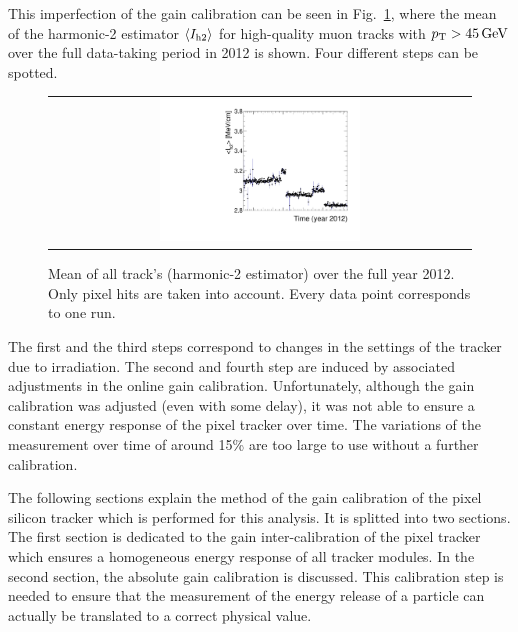 This imperfection of the gain calibration can be seen in Fig.~\ref{fig:StabilityPlot_beforeCalibration}, where the mean of the harmonic-2 estimator $\langle I_{\text{h2}} \rangle$ for high-quality muon tracks with $p_{\text{T}}>45\,\text{Ge}\kern-0.06667em\text{V}$ over the full data-taking period in 2012 is shown.
Four different steps can be spotted.
\begin{figure}[!t]
  \centering 
  \begin{tabular}{c}
  \includegraphics[width=0.49\textwidth]{figures/analysis/PixelCalibration/StabilityPlot_Pixel_beforeCalibration_withoutStepFits_NEW.pdf}
  \end{tabular}
  \caption{Mean of all track's \dedx (harmonic-2 estimator) over the full year 2012. Only pixel hits are taken into account. Every data point corresponds to one run.} 
  \label{fig:StabilityPlot_beforeCalibration}
\end{figure}
The first and the third steps correspond to changes in the settings of the tracker due to irradiation.
The second and fourth step are induced by associated adjustments in the online gain calibration.
Unfortunately, although the gain calibration was adjusted (even with some delay), it was not able to ensure a constant energy response of the pixel tracker over time. 
The variations of the \dedx measurement over time of around 15\% are too large to use \dedx without a further calibration. 

The following sections explain the method of the gain calibration of the pixel silicon tracker which is performed for this analysis. 
It is splitted into two sections. 
The first section is dedicated to the gain inter-calibration of the pixel tracker which ensures a homogeneous energy response of all tracker modules.
In the second section, the absolute gain calibration is discussed. 
This calibration step is needed to ensure that the measurement of the energy release of a particle can actually be translated to a correct physical value.


